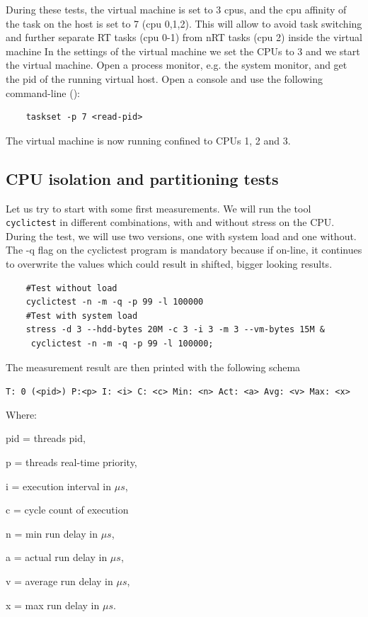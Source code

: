\documentclass[]{scrartcl}
\begin{document}
During these tests, the virtual machine is set to 3 cpus, and the cpu affinity of the task on the host is set to 7 (cpu 0,1,2). This will allow to avoid task switching and further separate RT tasks (cpu 0-1) from nRT tasks (cpu 2) inside the virtual machine
In the settings of the virtual machine we set the CPUs to 3 and we start the virtual machine.  Open a process monitor, e.g. the system monitor, and get the pid of the running virtual host. Open a console and use the following command-line (\cite{vbox01}):

\begin{verbatim}
	taskset -p 7 <read-pid>
\end{verbatim} 

The virtual machine is now running confined to CPUs 1, 2 and 3.

\subsection{CPU isolation and partitioning tests}

Let us try to start with some first measurements. We will run the tool \texttt{cyclictest} in different combinations, with and without stress on the CPU. During the test, we will use two versions, one with system load and one without. The -q flag on the cyclictest program is mandatory because if on-line, it continues to overwrite the values which could result in shifted, bigger looking results.

\begin{verbatim}
	#Test without load
	cyclictest -n -m -q -p 99 -l 100000
	#Test with system load
	stress -d 3 --hdd-bytes 20M -c 3 -i 3 -m 3 --vm-bytes 15M &
	 cyclictest -n -m -q -p 99 -l 100000;
\end{verbatim}

The measurement result are then printed with the following schema
\bigskip

\noindent \small \texttt{T: 0 (<pid>) P:<p> I: <i> C: <c> Min: <n> Act: <a> Avg: <v> Max: <x>}
\bigskip

Where:
\begin{where}
	\item[pid =] threads pid,
	\item[p =] threads real-time priority,
	\item[i =] execution interval in $\mu s$,
	\item[c =] cycle count of execution
	\item[n =] min run delay in $\mu s$,
	\item[a =] actual run delay in $\mu s$,
	\item[v =] average run delay in $\mu s$,
	\item[x =] max run delay in $\mu s$.
\end{where} 
\end{document}

